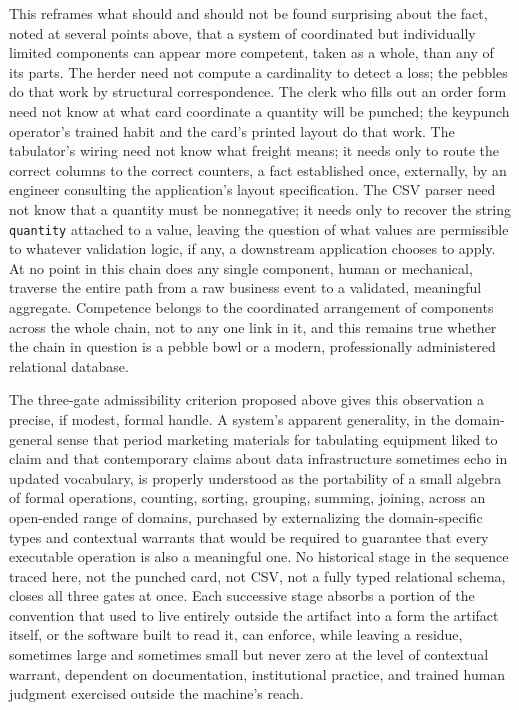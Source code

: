 \documentclass[11pt]{article}
\begin{document}
This reframes what should and should not be found surprising about the fact, noted at several points above, that a system of coordinated but individually limited components can appear more competent, taken as a whole, than any of its parts. The herder need not compute a cardinality to detect a loss; the pebbles do that work by structural correspondence. The clerk who fills out an order form need not know at what card coordinate a quantity will be punched; the keypunch operator's trained habit and the card's printed layout do that work. The tabulator's wiring need not know what freight means; it needs only to route the correct columns to the correct counters, a fact established once, externally, by an engineer consulting the application's layout specification. The CSV parser need not know that a quantity must be nonnegative; it needs only to recover the string \texttt{quantity} attached to a value, leaving the question of what values are permissible to whatever validation logic, if any, a downstream application chooses to apply. At no point in this chain does any single component, human or mechanical, traverse the entire path from a raw business event to a validated, meaningful aggregate. Competence belongs to the coordinated arrangement of components across the whole chain, not to any one link in it, and this remains true whether the chain in question is a pebble bowl or a modern, professionally administered relational database.

The three-gate admissibility criterion proposed above gives this observation a precise, if modest, formal handle. A system's apparent generality, in the domain-general sense that period marketing materials for tabulating equipment liked to claim and that contemporary claims about data infrastructure sometimes echo in updated vocabulary, is properly understood as the portability of a small algebra of formal operations, counting, sorting, grouping, summing, joining, across an open-ended range of domains, purchased by externalizing the domain-specific types and contextual warrants that would be required to guarantee that every executable operation is also a meaningful one. No historical stage in the sequence traced here, not the punched card, not CSV, not a fully typed relational schema, closes all three gates at once. Each successive stage absorbs a portion of the convention that used to live entirely outside the artifact into a form the artifact itself, or the software built to read it, can enforce, while leaving a residue, sometimes large and sometimes small but never zero at the level of contextual warrant, dependent on documentation, institutional practice, and trained human judgment exercised outside the machine's reach.
\end{document}
